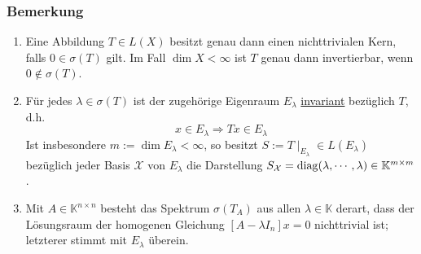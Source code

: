 \subsubsection{Bemerkung}
\label{4.2.2}
\renewcommand{\labelenumi}{(\arabic{enumi})}
\begin{enumerate}
\item Eine Abbildung $T\in L(X)$ besitzt genau dann einen nichttrivialen Kern, falls $0\in \sigma (T)$ gilt.  Im Fall $\dim X < \infty$ ist $T$ genau dann invertierbar, wenn $0\not\in\sigma (T)$.
\item Für jedes $\lambda \in \sigma (T)$ ist der zugehörige Eigenraum $E_\lambda$ \underline{invariant} bezüglich $T$, d.h.
\[x\in E_\lambda \Rightarrow Tx\in E_\lambda\]
Ist insbesondere $m:=\dim E_\lambda<\infty$, so besitzt $S:=T\mid _{E_\lambda} \in L(E_\lambda)$ bezüglich jeder Basis $\mathcal{X}$ von $E_\lambda$ die Darstellung $S_\mathcal{X}=\operatorname{diag}(\lambda ,\cdots ,\lambda )\in\mathbb{K}^{m\times m}$.
\item Mit $A\in\mathbb{K}^{n\times n}$ besteht das Spektrum $\sigma (T_A)$ aus allen $\lambda\in\mathbb{K}$ derart, dass der Lösungsraum der homogenen Gleichung $[A-\lambda I_n]x=0$ nichttrivial ist; letzterer stimmt mit $E_\lambda$ überein.
\end{enumerate}
